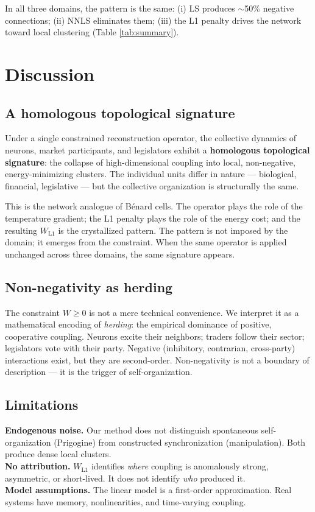 \documentclass[11pt,a4paper]{article}
\begin{document}
In all three domains, the pattern is the same: (i) LS produces $\sim$50\% negative connections; (ii) NNLS eliminates them; (iii) the L1 penalty drives the network toward local clustering (Table \ref{tab:summary}).

\section{Discussion}

\subsection{A homologous topological signature}
Under a single constrained reconstruction operator, the collective dynamics of neurons, market participants, and legislators exhibit a \textbf{homologous topological signature}: the collapse of high-dimensional coupling into local, non-negative, energy-minimizing clusters. The individual units differ in nature --- biological, financial, legislative --- but the collective organization is structurally the same.

This is the network analogue of Bénard cells. The operator plays the role of the temperature gradient; the L1 penalty plays the role of the energy cost; and the resulting $W_{\text{L1}}$ is the crystallized pattern. The pattern is not imposed by the domain; it emerges from the constraint. When the same operator is applied unchanged across three domains, the same signature appears.

\subsection{Non-negativity as herding}
The constraint $W \ge 0$ is not a mere technical convenience. We interpret it as a mathematical encoding of \textit{herding}: the empirical dominance of positive, cooperative coupling. Neurons excite their neighbors; traders follow their sector; legislators vote with their party. Negative (inhibitory, contrarian, cross-party) interactions exist, but they are second-order. Non-negativity is not a boundary of description --- it is the trigger of self-organization.

\subsection{Limitations}
\textbf{Endogenous noise.} Our method does not distinguish spontaneous self-organization (Prigogine) from constructed synchronization (manipulation). Both produce dense local clusters. \\
\textbf{No attribution.} $W_{\text{L1}}$ identifies \textit{where} coupling is anomalously strong, asymmetric, or short-lived. It does not identify \textit{who} produced it. \\
\textbf{Model assumptions.} The linear model is a first-order approximation. Real systems have memory, nonlinearities, and time-varying coupling.
\end{document}
